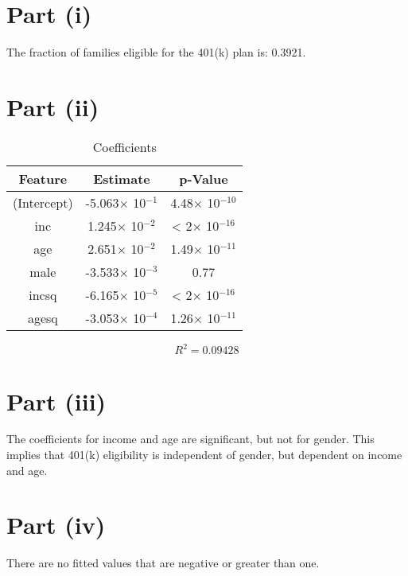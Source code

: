 \documentclass{./solution}
\begin{document}
 \begin{solution}[Wooldridge C7.9]
        \section*{Part (i)}
            The fraction of families eligible for the 401(k) plan is: 0.3921.

        \section*{Part (ii)}
            \begin{table}[H]
                \caption{Coefficients}
                \begin{tabularx}{\textwidth}{C C C}
                    \toprule
                    Feature & Estimate & p-Value \\
                    \midrule
                    (Intercept) & -5.063$\times$ 10$^{-1}$ &  4.48$\times$ 10$^{-10}$ \\
                    inc         &  1.245$\times$ 10$^{-2}$ &   < 2$\times$ 10$^{-16}$ \\
                    age         &  2.651$\times$ 10$^{-2}$ &  1.49$\times$ 10$^{-11}$ \\
                    male        & -3.533$\times$ 10$^{-3}$ &      0.77 \\
                    incsq       & -6.165$\times$ 10$^{-5}$ &   < 2$\times$ 10$^{-16}$ \\
                    agesq       & -3.053$\times$ 10$^{-4}$ &  1.26$\times$ 10$^{-11}$ \\
                    \bottomrule
                \end{tabularx}
            \end{table}
            \vspace{-5mm}
            $$ R^2 = 0.09428 $$

        \section*{Part (iii)}
            The coefficients for income and age are significant, but not for gender.
            This implies that 401(k) eligibility is independent of gender, but dependent on income and age.

        \section*{Part (iv)}
            There are no fitted values that are negative or greater than one.


\end{solution}
\end{document}
